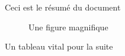 Ceci est le résumé du document

\begin{figure}[ht]
  \caption{Une figure magnifique}
  \label{fig:mafig}
\end{figure}

\begin{table}[ht]
  \caption{Un tableau vital pour la suite}
  \label{tab:vital}
\end{table}


